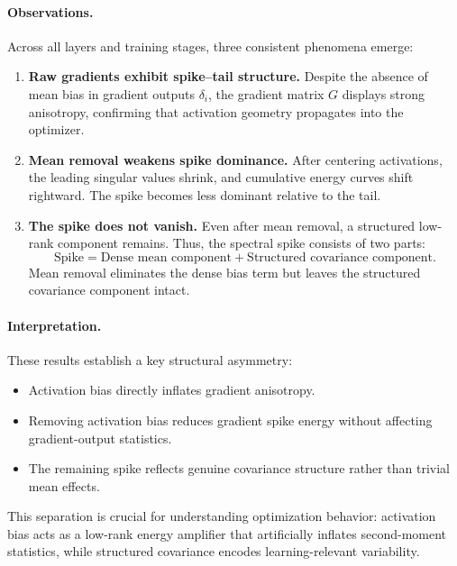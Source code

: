 \paragraph{Observations.}

Across all layers and training stages, three consistent phenomena emerge:

\begin{enumerate}
\item \textbf{Raw gradients exhibit spike–tail structure.}
Despite the absence of mean bias in gradient outputs $\delta_i$,
the gradient matrix $G$ displays strong anisotropy, confirming that
activation geometry propagates into the optimizer.

\item \textbf{Mean removal weakens spike dominance.}
After centering activations, the leading singular values shrink,
and cumulative energy curves shift rightward.
The spike becomes less dominant relative to the tail.

\item \textbf{The spike does not vanish.}
Even after mean removal, a structured low-rank component remains.
Thus, the spectral spike consists of two parts:
\[
\text{Spike} = \text{Dense mean component} + \text{Structured covariance component}.
\]
Mean removal eliminates the dense bias term but leaves the structured
covariance component intact.
\end{enumerate}

\paragraph{Interpretation.}

These results establish a key structural asymmetry:

\begin{itemize}
\item Activation bias directly inflates gradient anisotropy.
\item Removing activation bias reduces gradient spike energy
without affecting gradient-output statistics.
\item The remaining spike reflects genuine covariance structure rather
than trivial mean effects.
\end{itemize}

This separation is crucial for understanding optimization behavior:
activation bias acts as a low-rank energy amplifier that artificially
inflates second-moment statistics, while structured covariance encodes
learning-relevant variability.

